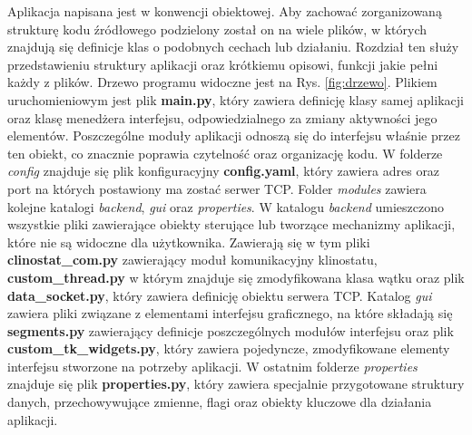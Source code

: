 Aplikacja napisana jest w konwencji obiektowej. Aby zachować zorganizowaną strukturę kodu źródłowego podzielony został on na wiele plików, w których znajdują się definicje klas o podobnych cechach lub działaniu. Rozdział ten służy przedstawieniu struktury aplikacji oraz krótkiemu opisowi, funkcji jakie pełni każdy z plików. Drzewo programu widoczne jest na Rys. \ref{fig:drzewo}. Plikiem uruchomieniowym jest plik \textbf{main.py}, który zawiera definicję klasy samej aplikacji oraz klasę menedżera interfejsu, odpowiedzialnego za zmiany aktywności jego elementów. Poszczególne moduły aplikacji odnoszą się do interfejsu właśnie przez ten obiekt, co znacznie poprawia czytelność oraz organizację kodu. W folderze \textit{config} znajduje się plik konfiguracyjny \textbf{config.yaml}, który zawiera adres oraz port na których postawiony ma zostać serwer TCP. Folder \textit{modules} zawiera kolejne katalogi \textit{backend}, \textit{gui} oraz \textit{properties}. W katalogu \textit{backend} umieszczono wszystkie pliki zawierające obiekty sterujące lub tworzące mechanizmy aplikacji, które nie są widoczne dla użytkownika. Zawierają się w tym pliki \textbf{clinostat\_com.py} zawierający moduł komunikacyjny klinostatu, \textbf{custom\_thread.py} w którym znajduje się zmodyfikowana klasa wątku oraz plik \textbf{data\_socket.py}, który zawiera definicję obiektu serwera TCP. Katalog \textit{gui} zawiera pliki związane z elementami interfejsu graficznego, na które składają się \textbf{segments.py} zawierający definicje poszczególnych modułów interfejsu oraz plik \textbf{custom\_tk\_widgets.py}, który zawiera pojedyncze, zmodyfikowane elementy interfejsu stworzone na potrzeby aplikacji. W ostatnim folderze \textit{properties} znajduje się plik \textbf{properties.py}, który zawiera specjalnie przygotowane struktury danych, przechowywujące zmienne, flagi oraz obiekty kluczowe dla działania aplikacji.

